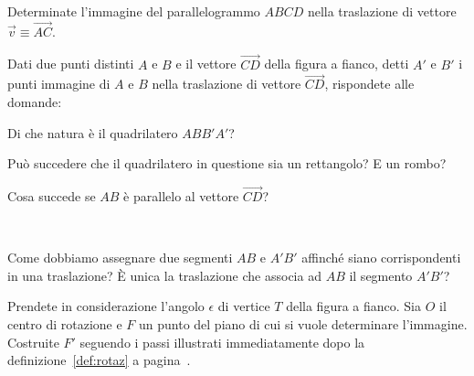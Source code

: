 \begin{esercizio}
\label{ese:8.45} %
Determinate l'immagine del parallelogrammo $ABCD$ nella traslazione 
di vettore $\vec{v} \equiv \overrightarrow{AC}$.
\end{esercizio}

\noindent\begin{minipage}{0.75\textwidth}\parindent15pt
\begin{esercizio}
\label{ese:8.46} %
Dati due punti distinti $A$ e $B$ e il vettore $\overrightarrow{CD}$ 
della figura a fianco, detti $A'$ e $B'$ i punti immagine di $A$ e 
$B$ nella traslazione di vettore $\overrightarrow{CD}$, rispondete 
alle domande:
\begin{enumeratea}
\item Di che natura è il quadrilatero $ABB'A'$?
\item Può succedere che il quadrilatero in questione sia un 
rettangolo? E un rombo?
\item Cosa succede se $AB$ è parallelo al vettore 
$\overrightarrow{CD}$?
\end{enumeratea}
\end{esercizio}
\end{minipage}\hfil
\begin{minipage}{0.25\textwidth}
	\centering~~
\end{minipage}\vspace{8pt}

\begin{esercizio}
\label{ese:8.47} %
Come dobbiamo assegnare due segmenti $AB$ e $A'B'$ affinché siano 
corrispondenti in una traslazione? \`E unica la traslazione che 
associa ad $AB$ il segmento $A'B'$?
\end{esercizio}

\begin{esercizio}
\label{ese:8.58} %
Prendete in considerazione l'angolo $\epsilon$ di vertice $T$ della 
figura a fianco. Sia $O$ il centro di rotazione e $F$ un punto del 
piano di cui si vuole determinare l'immagine. Costruite $F'$ seguendo 
i passi illustrati immediatamente dopo la definizione~\ref{def:rotaz} 
a pagina~\pageref{def:rotaz}.
\end{esercizio}
\begin{minipage}{0.3\textwidth}
	\centering~~
\end{minipage}\vspace{8pt}

